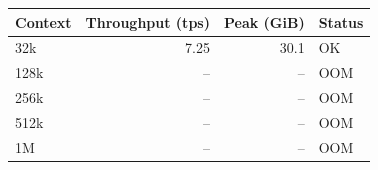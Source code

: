 \begin{tabular}{lrrl}
\toprule
Context & Throughput (tps) & Peak (GiB) & Status \\
\midrule
32k & 7.25 & 30.1 & OK \\
128k & -- & -- & OOM \\
256k & -- & -- & OOM \\
512k & -- & -- & OOM \\
1M & -- & -- & OOM \\
\bottomrule
\end{tabular}
